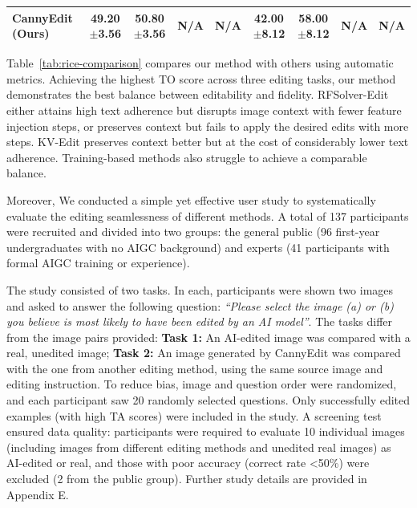 \documentclass{article}
\begin{document}
\begin{table}[t]
\begin{center}
{\begin{tabular}{lcccccccc}
\midrule
\textbf{CannyEdit (Ours)} & \textbf{49.20}{\scriptsize $\pm${3.56}} & \textbf{50.80}{\scriptsize $\pm${3.56}} & N/A & N/A & \textbf{42.00}{\scriptsize $\pm${8.12}} & \textbf{58.00}{\scriptsize $\pm${8.12}} & N/A & N/A\\
\bottomrule
\end{tabular}}
\label{tab:rice-human-study} 
\end{center}
\end{table}

Table~\ref{tab:rice-comparison} compares our method with others using automatic metrics. Achieving the highest TO score across three editing tasks, our method demonstrates the best balance between editability and fidelity. RFSolver-Edit either attains high text adherence but disrupts image context with fewer feature injection steps, or preserves context but fails to apply the desired edits with more steps. KV-Edit preserves context better but at the cost of considerably lower text adherence. Training-based methods also struggle to achieve a comparable balance.

Moreover, We conducted a simple yet effective user study to systematically evaluate the editing seamlessness of different methods. A total of 137 participants were recruited and divided into two groups: the general public (96 first-year undergraduates with no AIGC background) and experts (41 participants with formal AIGC training or experience).

The study consisted of two tasks. In each, participants were shown two images and asked to answer the following question: \emph{``Please select the image (a) or (b) you believe is most likely to have been edited by an AI model''}. The tasks differ from the image pairs provided: \textbf{Task 1:} An AI-edited image was compared with a real, unedited image; \textbf{Task 2:} An image generated by CannyEdit was compared with the one from another editing method, using the same source image and editing instruction. To reduce bias, image and question order were randomized, and each participant saw 20 randomly selected questions. Only successfully edited examples (with high TA scores) were included in the study. A screening test ensured data quality: participants were required to evaluate 10 individual images (including images from different editing methods and unedited real images) as AI-edited or real, and those with poor accuracy (correct rate <50\%) were excluded (2 from the public group). Further study details are provided in {Appendix E}.
\end{document}
